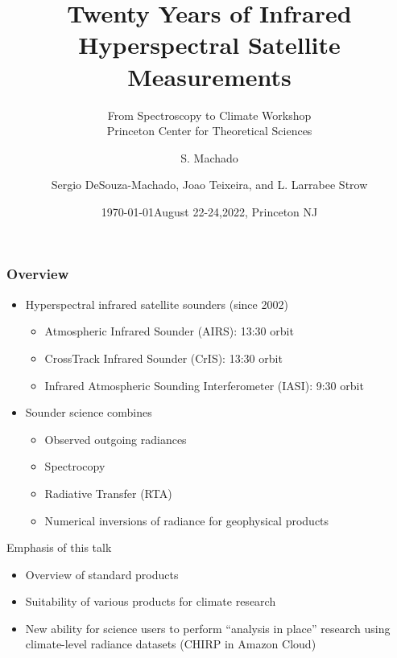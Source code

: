 \documentclass[10pt,t]{beamer}
\author{S. Machado}
\date{\today}
\title{\large Twenty Years of Infrared Hyperspectral Satellite Measurements}
\subtitle{\footnotesize{From Spectroscopy to Climate Workshop \\ \vspace{-0.07in} Princeton Center for Theoretical Sciences}}
\date{\vspace{0.1in}\footnotesize{August 22-24,2022, Princeton NJ \vfill}}
\author{Sergio DeSouza-Machado\inst{1}, Joao Teixeira\inst{2}, and L. Larrabee Strow\inst{1}}
\institute{\inst{1}UMBC Physics Department \and \inst{2}NASA Jet Propulsion Laboratory}
\begin{document}
\maketitle
\begin{frame}
  \frametitle{Overview}  
  \begin{itemize}
  \item Hyperspectral infrared satellite sounders (since 2002)
    \begin{itemize}
    \item Atmospheric Infrared Sounder (AIRS): 13:30 orbit
    \item CrossTrack Infrared Sounder (CrIS):  13:30 orbit
    \item Infrared Atmospheric Sounding Interferometer (IASI): 9:30 orbit
    \end{itemize}
  \item Sounder science combines
    \begin{itemize}
    \item Observed outgoing radiances
    \item Spectrocopy
    \item Radiative Transfer (RTA)
    \item Numerical inversions of radiance for geophysical products
    \end{itemize}
  \end{itemize}
  \begin{block}{Emphasis of this talk}
    \begin{itemize}
    \item Overview of standard products
    \item Suitability of various products for climate research
    \item New ability for science users to perform ``analysis in place'' research using climate-level radiance datasets (CHIRP in Amazon Cloud)
    \end{itemize}
  \end{block}
\end{frame}
\end{document}
